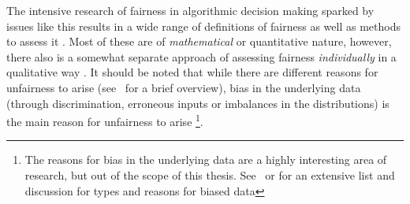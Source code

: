 The intensive research of fairness in algorithmic decision making sparked by issues like this results in a wide range of definitions of fairness as well as methods to assess it \parencite{CorbettDavies2023}.
Most of these are of \textit{mathematical} or quantitative nature, however, there also is a somewhat separate approach of assessing fairness \textit{individually} in a qualitative way \parencite{Chouldechova2018}.
It should be noted that while there are different reasons for unfairness to arise (see~\cite{Chouldechova2018} for a brief overview), bias in the underlying data (through discrimination, erroneous inputs or imbalances in the distributions) 
is the main reason for unfairness to arise \parencite{Choras2020}\footnote{The reasons for bias in the underlying data are a highly interesting area of research, but out of the scope of this thesis. See~\cite{Mehrabi2021} or \cite{Jui2024} for an extensive list and discussion for types and reasons for biased data}.
%
